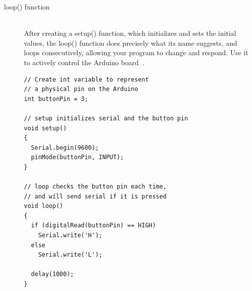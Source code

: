 \begin{description}
\newpage	
	\item[loop() function] \hfill \\
	After creating a setup() function, which initializes and sets the initial values, the loop() function does precisely what its name suggests, and loops consecutively, allowing your program to change and respond. Use it to actively control the Arduino board~\citep{arduino-15-d}.
	\begin{lstlisting}
// Create int variable to represent
// a physical pin on the Arduino
int buttonPin = 3;

// setup initializes serial and the button pin
void setup()
{
  Serial.begin(9600);
  pinMode(buttonPin, INPUT);
}

// loop checks the button pin each time,
// and will send serial if it is pressed
void loop()
{
  if (digitalRead(buttonPin) == HIGH)
    Serial.write('H');
  else
    Serial.write('L');
  
  delay(1000);
}
	\end{lstlisting}
\end{description}